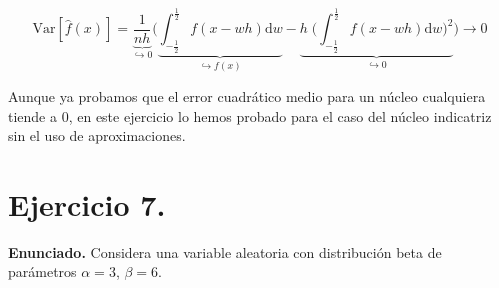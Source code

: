 \documentclass[a4paper]{article}
\newcommand{\Var}{\text{Var}}
\begin{document}
\[
	\Var [ \hat f(x)] = \underbrace{\frac{1}{n h}}_{\hookrightarrow 0} \bigg( \underbrace{\int_{-\frac{1}{2}}^{\frac{1}{2}} f(x - wh) \text{d}w}_{\hookrightarrow f(x)} - \underbrace{h \; \bigg( \int_{-\frac{1}{2}}^{\frac{1}{2}} f(x - wh) \text{d}w\bigg) ^2}_{\hookrightarrow 0} \bigg)
	\longrightarrow 0
\]

Aunque ya probamos que el error cuadrático medio para un núcleo cualquiera tiende a $0$, en este ejercicio lo hemos probado para el caso del núcleo indicatriz sin el uso de aproximaciones.

\section*{Ejercicio 7.}

\textbf{Enunciado.} Considera una variable aleatoria con distribución beta de parámetros $\alpha = 3$, $\beta = 6$.
\end{document}

